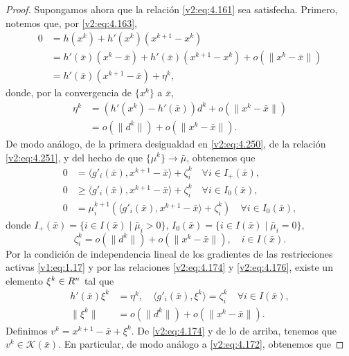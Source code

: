 \begin{proof}
    Supongamos ahora que la relación \eqref{v2:eq:4.161} sea satisfecha. Primero, notemos que, por \eqref{v2:eq:4.163},
    \begin{align}
        0 &= h(x^k) + h'(x^k)(x^{k+1} - x^k) \nonumber \\
        &= h'(\bar{x})(x^k - \bar{x}) + h'(\bar{x})(x^{k+1} - x^k) + o(\|x^k - \bar{x}\|) \nonumber \\
        &= h'(\bar{x})(x^{k+1} - \bar{x}) + \eta^k,
        \label{v2:eq:4.174}
    \end{align}
    donde, por la convergencia de $\{x^k\}$ a $\bar{x}$,
    \begin{align}
        \eta^k &= (h'(x^k) - h'(\bar{x}))d^k + o(\|x^k - \bar{x}\|) \nonumber \\
        &= o(\|d^k\|) + o(\|x^k - \bar{x}\|).
        \label{v2:eq:4.175}
    \end{align}
    De modo análogo, de la primera desigualdad en \eqref{v2:eq:4.250}, de la relación \eqref{v2:eq:4.251}, y del hecho de que $\{\mu^k\} \to \bar{\mu}$, obtenemos que
    \begin{align*}
        0 &= \langle g'_i(\bar{x}), x^{k+1} - \bar{x} \rangle + \zeta^k_i \quad \forall i \in I_+(\bar{x}), \\
        0 &\ge \langle g'_i(\bar{x}), x^{k+1} - \bar{x} \rangle + \zeta^k_i \quad \forall i \in I_0(\bar{x}), \\
        0 &= \mu_i^{k+1} (\langle g'_i(\bar{x}), x^{k+1} - \bar{x} \rangle + \zeta^k_i) \quad \forall i \in I_0(\bar{x}),
    \end{align*}
    donde $I_+(\bar{x}) = \{i \in I(\bar{x}) \mid \bar{\mu}_i > 0\}$, $I_0(\bar{x}) = \{i \in I(\bar{x}) \mid \bar{\mu}_i = 0\}$,
    \[
        \zeta^k_i = o(\|d^k\|) + o(\|x^k - \bar{x}\|), \quad i \in I(\bar{x}).
    \]
    Por la condición de independencia lineal de los gradientes de las restricciones activas \eqref{v1:eq:1.17} y por las relaciones \eqref{v2:eq:4.174} y \eqref{v2:eq:4.176}, existe un elemento $\xi^k \in R^n$ tal que
    \begin{align*}
        h'(\bar{x})\xi^k &= \eta^k, \quad \langle g'_i(\bar{x}), \xi^k \rangle = \zeta^k_i \quad \forall i \in I(\bar{x}), \\
        \|\xi^k\| &= o(\|d^k\|) + o(\|x^k - \bar{x}\|).
    \end{align*}
    Definimos $v^k = x^{k+1} - \bar{x} + \xi^k$. De \eqref{v2:eq:4.174} y de lo de arriba, tenemos que $v^k \in \mathcal{K}(\bar{x})$. En particular, de modo análogo a \eqref{v2:eq:4.172}, obtenemos que

\end{proof}
